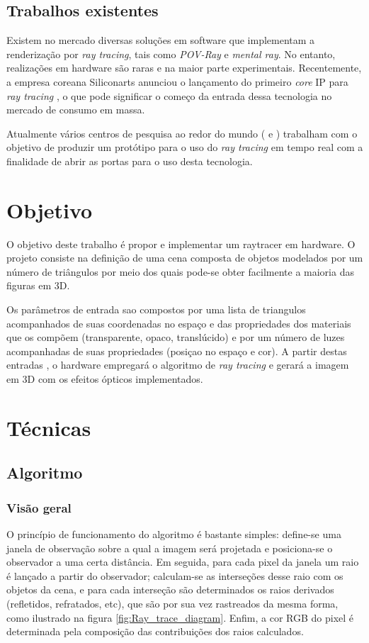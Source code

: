 \documentclass[a4paper,12pt]{article}
\newcommand\raytracing{\emph{ray tracing}}
\begin{document}
\subsection{Trabalhos existentes}

Existem no mercado diversas soluções em software que implementam
a renderização por \raytracing{}, tais como \emph{POV-Ray} e
\emph{mental ray}. No entanto, realizações em hardware são raras e
na maior parte experimentais. Recentemente, a empresa coreana Siliconarts
anunciou o lançamento do primeiro \emph{core} IP para \raytracing{}
\cite{raycore}, o que pode significar o começo da entrada dessa tecnologia
no mercado de consumo em massa.

Atualmente vários centros de pesquisa ao redor do mundo (\cite{hanika} e
\cite{purcell}) trabalham com o objetivo de produzir um protótipo para o uso do
\raytracing{} em tempo real com a finalidade de abrir as portas para o uso desta
tecnologia.

\section{Objetivo}
O objetivo deste trabalho é propor e implementar um raytracer em hardware. O
projeto consiste na definição de uma cena composta de objetos modelados por um
número de triângulos por meio dos quais pode-se obter facilmente a maioria das
figuras em 3D.

Os parâmetros de entrada sao compostos por uma lista de triangulos acompanhados
de suas coordenadas no espaço e das propriedades dos materiais que os compõem
(transparente, opaco, translúcido) e por um número de luzes acompanhadas de
suas propriedades (posiçao no espaço e cor). A partir destas entradas , o
hardware empregará o algoritmo de \raytracing{} e gerará a imagem em 3D com os
efeitos ópticos implementados.

\section{Técnicas}
\subsection{Algoritmo}
\subsubsection{Visão geral}
O princípio de funcionamento do algoritmo é bastante simples: define-se uma
janela de observação sobre a qual a imagem será projetada e posiciona-se o
observador a uma certa distância. Em seguida, para cada pixel da janela
um raio é lançado a partir do observador; calculam-se as interseções
desse raio com os objetos da cena, e para cada interseção são determinados
os raios derivados (refletidos, refratados, etc), que são por sua vez rastreados
da mesma forma, como ilustrado na figura \ref{fig:Ray_trace_diagram}. Enfim, a
cor RGB do pixel é determinada pela composição das contribuições dos raios
calculados.
\end{document}
